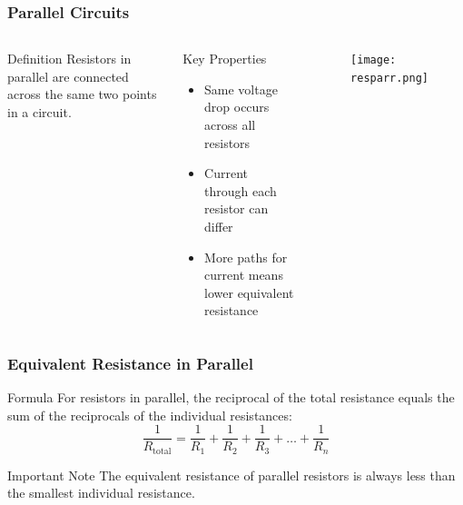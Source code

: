 \documentclass{beamer}
\begin{document}
\begin{frame}
    \frametitle{Parallel Circuits}
    \begin{columns}
        \begin{block}{Definition}
            Resistors in parallel are connected across the same two points in a circuit.
        \end{block}
        
        \begin{block}{Key Properties}
            \begin{itemize}
                \item Same voltage drop occurs across all resistors
                \item Current through each resistor can differ
                \item More paths for current means lower equivalent resistance
            \end{itemize}
        \end{block}
        
        \begin{alertblock}{ }
           \begin{figure}
               \centering
               \texttt{[image: resparr.png]}
           \end{figure}
        \end{alertblock}
    \end{columns}
\end{frame}

\begin{frame}
    \frametitle{Equivalent Resistance in Parallel}
    \begin{block}{Formula}
        For resistors in parallel, the reciprocal of the total resistance equals the sum of the reciprocals of the individual resistances:
        \begin{equation}
            \frac{1}{R_{\text{total}}} = \frac{1}{R_1} + \frac{1}{R_2} + \frac{1}{R_3} + \ldots + \frac{1}{R_n}
        \end{equation}
    \end{block}
    
   
    \begin{block}{Important Note}
        The equivalent resistance of parallel resistors is always less than the smallest individual resistance.
    \end{block}
\end{frame}
\end{document}
